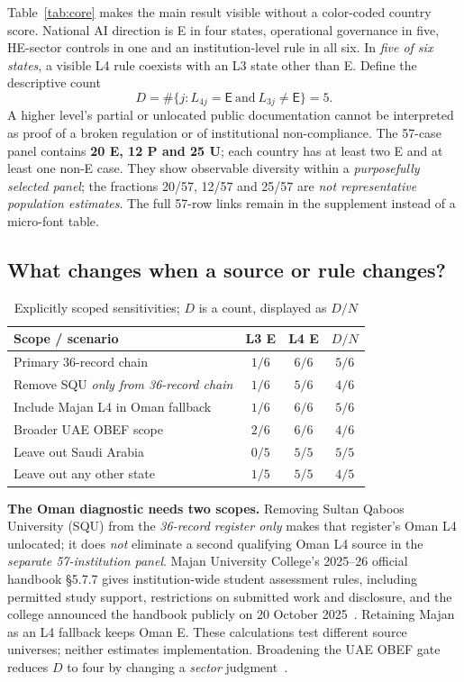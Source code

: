 \documentclass[conference,letterpaper]{IEEEtran}
\newcommand{\stE}{\textsf{E}}
\begin{document}
Table~\ref{tab:core} makes the main result visible without a color-coded country score. National AI direction is E in four states, operational governance in five, HE-sector controls in one and an institution-level rule in all six. In \emph{five of six states}, a visible L4 rule coexists with an L3 state other than E. Define the descriptive count
\begin{equation}\label{eq:d}
D=\#\{j:L_{4j}=\stE\ \text{and}\ L_{3j}\neq\stE\}=5.
\end{equation}
A higher level's partial or unlocated public documentation cannot be interpreted as proof of a broken regulation or of institutional non-compliance. The 57-case panel contains \textbf{20 E, 12 P and 25 U}; each country has at least two E and at least one non-E case. They show observable diversity within a \emph{purposefully selected panel}; the fractions 20/57, 12/57 and 25/57 are \emph{not representative population estimates}. The full 57-row links remain in the supplement instead of a micro-font table.

\subsection{What changes when a source or rule changes?}
\begin{table}[H]
\centering\caption{Explicitly scoped sensitivities; $D$ is a count, displayed as $D/N$}
\label{tab:sensitivity}\small
\setlength{\tabcolsep}{3pt}
\begin{tabularx}{\columnwidth}{@{}Xccc@{}}
\toprule
Scope / scenario & L3 E & L4 E & $D/N$\tabularnewline\midrule
Primary 36-record chain & $1/6$ & $6/6$ & $5/6$\tabularnewline
Remove SQU \emph{only from 36-record chain} & $1/6$ & $5/6$ & $4/6$\tabularnewline
Include Majan L4 in Oman fallback\footnotemark & $1/6$ & $6/6$ & $5/6$\tabularnewline
Broader UAE OBEF scope & $2/6$ & $6/6$ & $4/6$\tabularnewline
Leave out Saudi Arabia & $0/5$ & $5/5$ & $5/5$\tabularnewline
Leave out any other state & $1/5$ & $5/5$ & $4/5$\tabularnewline\bottomrule
\end{tabularx}
\end{table}

\textbf{The Oman diagnostic needs two scopes.} Removing Sultan Qaboos University (SQU) from the \emph{36-record register only} makes that register's Oman L4 unlocated; it does \emph{not} eliminate a second qualifying Oman L4 source in the \emph{separate 57-institution panel}. Majan University College's 2025--26 official handbook \S5.7.7 gives institution-wide student assessment rules, including permitted study support, restrictions on submitted work and disclosure, and the college announced the handbook publicly on 20 October 2025~\cite{majanhb,majannews}. Retaining Majan as an L4 fallback keeps Oman E. These calculations test different source universes; neither estimates implementation. Broadening the UAE OBEF gate reduces $D$ to four by changing a \emph{sector} judgment~\cite{obef}.
\end{document}
